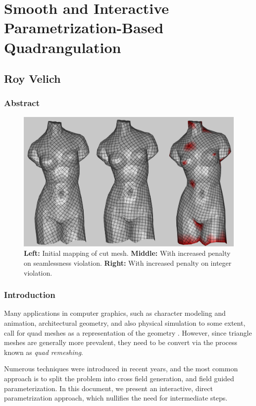 \chapter*{\centering Smooth and Interactive Parametrization-Based Quadrangulation}
\section*{\centering Roy Velich}
\subsection*{\centering Abstract}
\begin{figure}[ht]
\centering
\includegraphics[width=15cm]{figures/teaser.png}
\caption[Abstract's Teaser]{\textbf{Left:} Initial mapping of cut mesh. \textbf{Middle:} With increased penalty on seamlessness violation. \textbf{Right:} With increased penalty on integer violation.}
\label{fig:teaser}
\end{figure}

\subsection*{Introduction}
Many applications in computer graphics, such as character modeling and animation, architectural geometry, and also physical simulation to some extent, call for quad meshes as a representation of the geometry \cite{10.1111/cgf.12014}. However, since triangle meshes are generally more prevalent, they need to be convert via the process known as \emph{quad remeshing}.

\noindent Numerous techniques were introduced in recent years, and the most common approach is to split the problem into cross field generation, and field guided parameterization. In this document, we present an interactive, direct parametrization approach, which nullifies the need for intermediate steps.

